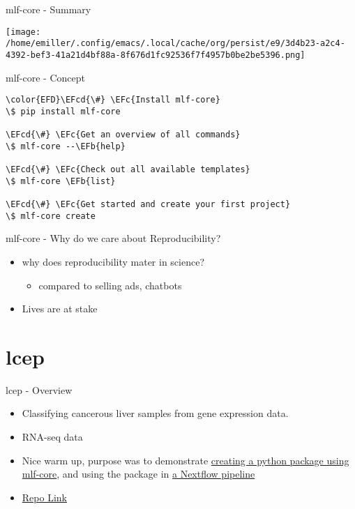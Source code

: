 \documentclass[bigger]{beamer}
\newcommand{\EFc}[1]{\textcolor{EFc}{#1}} %
\newcommand{\EFcd}[1]{\textcolor{EFcd}{#1}} %
\newcommand{\EFb}[1]{\textcolor{EFb}{#1}} %
\begin{document}
\begin{frame}[label={sec:org201cd95}]{mlf-core - Summary}
\begin{center}
\texttt{[image: /home/emiller/.config/emacs/.local/cache/org/persist/e9/3d4b23-a2c4-4392-bef3-41a21d4bf88a-8f676d1fc92536f7f4957b0be2be5396.png]}
\end{center}
\end{frame}

\begin{frame}[label={sec:org593fcd0},fragile]{mlf-core - Concept}
 \begin{Code}
\begin{Verbatim}
\color{EFD}\EFcd{\#} \EFc{Install mlf-core}
\$ pip install mlf-core

\EFcd{\#} \EFc{Get an overview of all commands}
\$ mlf-core --\EFb{help}

\EFcd{\#} \EFc{Check out all available templates}
\$ mlf-core \EFb{list}

\EFcd{\#} \EFc{Get started and create your first project}
\$ mlf-core create
\end{Verbatim}
\end{Code}
\end{frame}

\begin{frame}[label={sec:orge7751bc}]{mlf-core - Why do we care about Reproducibility?}
\begin{itemize}
\item why does reproducibility mater in science?
\begin{itemize}
\item compared to selling ads, chatbots
\end{itemize}
\item Lives are at stake
\end{itemize}

\end{frame}

\section*{lcep}
\label{sec:org4ad1eec}
\begin{frame}[label={sec:org82fd096}]{lcep - Overview}
\begin{itemize}
\item Classifying cancerous liver samples from gene expression data.
\item RNA-seq data
\item Nice warm up, purpose was to demonstrate \href{https://github.com/mlf-core/lcep-package}{creating a python package using
mlf-core}, and using the package in \href{https://github.com/mlf-core/nextflow-lcep}{a Nextflow pipeline}
\item \href{https://github.com/Emiller88/state-of-ml-for-biology-julia/tree/main/lcep}{Repo Link}
\end{itemize}
\end{frame}
\end{document}
